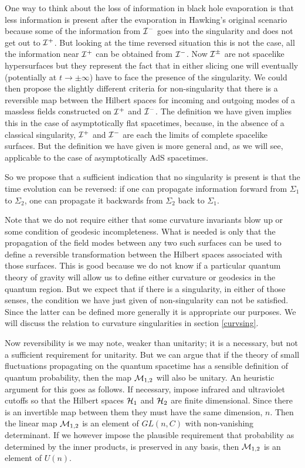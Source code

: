 \documentclass[12pt]{article}
\begin{document}
One way to think about the loss of information in black hole evaporation is that less information is present after the evaporation in Hawking's original scenario because some of the information from ${\cal I}^-$ goes into the singularity and does not get out to ${\cal I}^+$. But looking at the time reversed situation this is not the case, all the information near ${\cal I}^+$ can be obtained from ${\cal I}^-$. Now
${\cal I}^{\pm}$ are not spacelike hypersurfaces but they represent the fact that in either slicing one will eventually 
(potentially at $t \to \pm \infty$) have to face the presence of the singularity. We could then propose the slightly 
different criteria for non-singularity that there is a reversible map between the Hilbert spaces for incoming and outgoing modes of a massless fields constructed on ${\cal I}^+$ and ${\cal I}^-$.  The definition we have given implies this in the
case of asymptotically flat spacetimes, because, in the absence of a classical singularity, ${\cal I}^+$ and ${\cal I}^-$ are each 
the limits of complete spacelike surfaces.  But the definition we have given is more general and, as we will see, applicable to the 
case of asymptotically AdS spacetimes.  

So we propose that a sufficient indication that no singularity is present is that the time evolution can be
reversed: if one can propagate information forward from $\Sigma_1$ to $\Sigma_2$, one can propagate it backwards from $\Sigma_2$ back to  $\Sigma_1$. 

Note that we do not require either that some curvature invariants blow up or some condition of geodesic incompleteness. What is needed is only that the propagation of the field modes between any two such surfaces can be used to define a reversible  transformation between 
the  Hilbert spaces associated with those surfaces.   This is good because we do not know if a particular quantum theory of gravity will allow us to define either curvature or geodesics in the quantum region. But we expect that if there is a singularity, in either of those senses, the condition we have just given of non-singularity can not be satisfied.  Since the latter can be defined more generally it is appropriate our purposes. We will discuss the relation to curvature singularities in section \ref{curvsing}.

Now reversibility is we may note, weaker than unitarity; it is a necessary, but not a sufficient requirement for unitarity. 
But we can argue that if the theory of small fluctuations propagating on the quantum spacetime has a sensible definition of quantum probability, then the map ${\cal M}_{1,2}$ will 
also be unitary.  An heuristic argument
for this goes as follows. If necessary, impose infrared and ultraviolet cutoffs so that the Hilbert spaces ${\cal H}_1$ and ${\cal H}_2$ are finite dimensional.  Since there is an invertible map between them they must have the same dimension, $n$.  Then 
the linear map ${\cal M}_{1,2}$ is an element of $GL(n,C)$ with non-vanishing determinant.  If we however impose the plausible requirement that
probability as determined by the inner products, is preserved in any basis, then ${\cal M}_{1,2}$ is an element of $U(n)$.  
\end{document}
